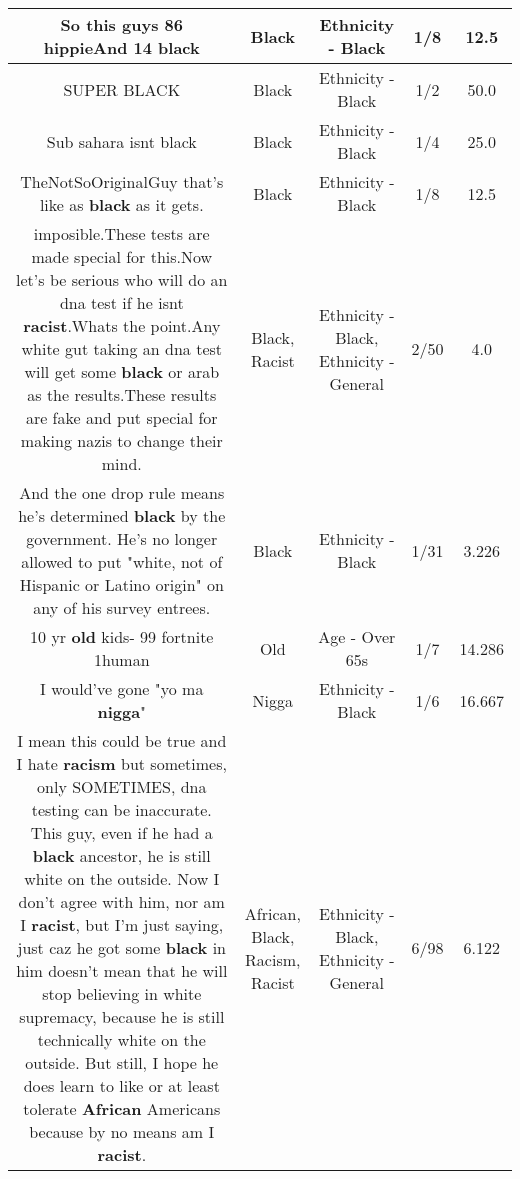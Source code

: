 \documentclass[11pt]{article}
\newlength\mylength
\begin{document}
\begin{center}
\begin{longtable}{|C{.65\mylength}|C{.30\mylength}|C{.12\mylength}|C{.12\mylength}|C{.12\mylength}|}
  \small So this guys 86 hippieAnd 14 black\normalsize   & Black & Ethnicity - Black & 1/8 & 12.5 \\  \hline
  \small SUPER BLACK\normalsize   & Black & Ethnicity - Black & 1/2 & 50.0 \\  \hline
  \small Sub sahara isnt black\normalsize   & Black & Ethnicity - Black & 1/4 & 25.0 \\  \hline
  \small TheNotSoOriginalGuy that's like as \textbf{black} as it gets.\normalsize   & Black & Ethnicity - Black & 1/8 & 12.5 \\  \hline
  \small imposible.These tests are made special for this.Now let's be serious who will do an dna test if he isnt \textbf{racist}.Whats the point.Any white gut taking an dna test will get some \textbf{black} or arab as the results.These results are fake and put special for making nazis to change their mind.\normalsize   & Black, Racist & Ethnicity - Black, Ethnicity - General & 2/50 & 4.0 \\  \hline
  \small And the one drop rule means he's determined \textbf{black} by the government. He's no longer allowed to put "white, not of Hispanic or Latino origin" on any of his survey entrees.\normalsize   & Black & Ethnicity - Black & 1/31 & 3.226 \\  \hline
  \small 10 yr \textbf{old} kids- 99 fortnite 1human\normalsize   & Old & Age - Over 65s & 1/7 & 14.286 \\  \hline
  \small I would've gone "yo ma \textbf{nigga}"\normalsize   & Nigga & Ethnicity - Black & 1/6 & 16.667 \\  \hline
  \small I mean this could be true and I hate \textbf{racism} but sometimes, only SOMETIMES, dna testing can be inaccurate. This guy, even if he had a \textbf{black} ancestor, he is still white on the outside. Now I don't agree with him, nor am I \textbf{racist}, but I'm just saying, just caz he got some \textbf{black} in him doesn't mean that he will stop believing in white supremacy, because he is still technically white on the outside. But still, I hope he does learn to like or at least tolerate \textbf{African} Americans because by no means am I \textbf{racist}.\normalsize   & African, Black, Racism, Racist & Ethnicity - Black, Ethnicity - General & 6/98 & 6.122 \\  \hline

\end{longtable}
\end{center}
\end{document}
